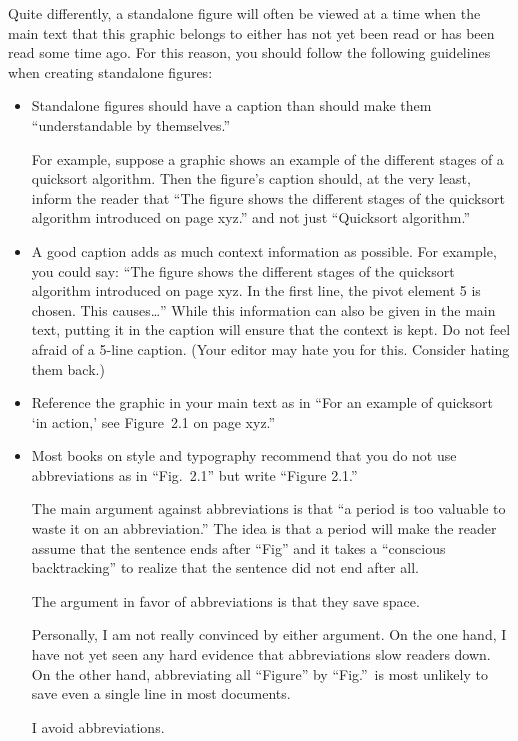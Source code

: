 Quite differently, a standalone figure will often be viewed at a time
when the main text that this graphic belongs to either has not yet
been read or has been read some time ago. For this reason, you should
follow the following guidelines when creating standalone figures:
\begin{itemize}
\item
  Standalone figures should have a caption than should make them
  ``understandable by themselves.''

  For example, suppose a graphic shows an example of the different
  stages of a quicksort algorithm. Then the figure's caption should,
  at the very least, inform the reader that ``The figure shows the
  different stages of the quicksort algorithm introduced on page
  xyz.'' and not just ``Quicksort algorithm.''
\item
  A good caption adds as much context information as possible. For
  example, you could say: ``The figure shows the different stages of
  the quicksort algorithm introduced on page xyz. In the first line,
  the pivot element 5 is chosen. This causes\dots'' While this
  information can also be given in the main text, putting it in the
  caption will ensure that the context is kept. Do not feel afraid of
  a 5-line caption. (Your editor may hate you for this. Consider
  hating them back.)
\item
  Reference the graphic in your main text as in ``For an example of
  quicksort `in action,' see Figure~2.1 on page xyz.''
\item
  Most books on style and typography recommend that you do not use
  abbreviations as in ``Fig.~2.1'' but write ``Figure 2.1.''

  The main argument against abbreviations is that ``a period is too
  valuable to waste it on an abbreviation.'' The idea is that a period
  will make the reader assume that the sentence ends after ``Fig'' and
  it takes a ``conscious backtracking'' to realize that the sentence
  did not end after all.

  The argument in favor of abbreviations is that they save space.
  
  Personally, I am not really convinced by either argument. On the one
  hand, I have not yet seen any hard evidence that abbreviations slow 
  readers down. On the other hand,  abbreviating all ``Figure'' by
  ``Fig.''\ is most unlikely to save even a single line in  most
  documents.  

  I avoid abbreviations.
\end{itemize}



